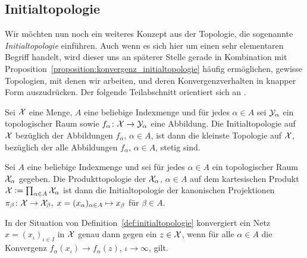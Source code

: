 \documentclass[../thesis/thesis.tex]{subfiles}
\begin{document}
	\subsection*{Initialtopologie}
	
	Wir möchten nun noch ein weiteres Konzept aus der Topologie, die sogenannte \emph{Initialtopologie} einführen.
	Auch wenn es sich hier um einen sehr elementaren Begriff handelt, wird dieser uns an späterer Stelle gerade 
	in Kombination mit Proposition~\ref{proposition:konvergenz_initialtopologie} häufig ermöglichen, 
	gewisse Topologien, mit denen wir arbeiten, und deren Konvergenzverhalten in knapper Form auszudrücken. 
	Der folgende Teilabschnitt orientiert sich an \cite[Section 2.13]{Aliprantis.2006}.
	
	\begin{Definition}[Initialtopologie]
		\label{def:initialtopologie}
		Sei $\mathcal{X}$ eine Menge, $A$ eine beliebige Indexmenge und für jedes $\alpha \in A$ sei $\mathcal{Y}_\alpha$ ein topologischer Raum sowie $f_\alpha \colon \mathcal{X} \to \mathcal{Y}_\alpha$ eine Abbildung.
		Die Initialtopologie auf $\mathcal{X}$ bezüglich der Abbildungen $f_\alpha$, $\alpha \in A$, ist dann die kleinste Topologie auf $\mathcal{X}$, bezüglich der alle Abbildungen 
		$f_\alpha$, $\alpha \in A$, stetig sind.
	\end{Definition}

	\begin{Bemerkung}[Produkttopologie]
		Sei $A$ eine beliebige Indexmenge und sei für jedes $\alpha \in A$ ein topologischer Raum $\mathcal{X}_\alpha$ gegeben. Die Produkttopologie der $\mathcal{X}_\alpha$, $\alpha \in A$
		auf dem kartesischen Produkt $\mathcal{X} \vcentcolon = \prod_{\alpha \in A} \mathcal{X}_\alpha$ ist dann die Initialtopologie der kanonischen Projektionen 
		$\pi_\beta \colon \mathcal{X} \to \mathcal{X}_\beta, \; x = (x_\alpha)_{\alpha \in A} \mapsto x_\beta $ für $\beta \in A$.
	\end{Bemerkung}
	
	\begin{Proposition}
		\label{proposition:konvergenz_initialtopologie}
		In der Situation von Definition~\ref{def:initialtopologie} konvergiert ein Netz $x = (x_{\iota})_{\iota \in I}$ in $\mathcal{X}$ genau dann gegen ein $z \in \mathcal{X}$, wenn für alle $\alpha \in A$
		die Konvergenz $f_\alpha(x_\iota) \to f_\alpha(z)$, $\iota \to \infty$, gilt.
	\end{Proposition}
\end{document}
